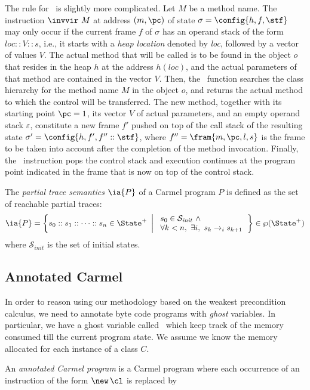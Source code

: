 The rule for \invvir\ is slightly more complicated. Let
$M$ be a method name. The instruction $\invvir\ M$ at
address $(m,\pc)$ of state $\sigma =\config{h,f,\stf}$ may only
occur if the current frame $f$  of $\sigma$ has an
operand stack of the form $\mathit{loc}::V::s$, i.e., it starts with a
{\em heap location} denoted by \textit{loc}, followed by a vector of
values $V$. The actual method that will be called is to be found in
the object $o$ that resides in the heap $h$ at the address $h(loc)$, and
the actual parameters of that method are contained in the vector
$V$. Then, the \methodLookup\ function searches the class hierarchy
for the method name $M$ in the object $o$, and returns the actual method
to which the control will be transferred.  The new method, together
with its starting point $\pc = 1$, its vector $V$ of actual parameters,
and an empty operand stack $\varepsilon$, constitute a new frame $f'$
pushed on top of the call stack of the resulting state 
$\sigma' = \config{h,f',f''::\stf}$, where $f'' = \fram{m,\pc,l,s}$ is the frame to be taken into account after the completion of the method invocation.
Finally, the \return\ instruction pops the control stack and
execution continues at the program point indicated in the frame that is
now on top of the control stack. 

The {\em partial trace semantics} $\ia{P}$ of a Carmel program $P$
is defined as the set of reachable partial traces:
$$\ia{P} = \left\lbrace s_0:: s_1::\cdots ::s_n \in\State^+\ \left|\ 
    \begin{array}[c]{l}
s_0\in\mathcal{S}_{\mathit{init}}\ \wedge\\
\forall k<n,\ \exists i,\ s_k\to_i s_{k+1}
\end{array}\right.
\right\rbrace\in\wp(\State^+)$$
where $\mathcal{S}_{\mathit{init}}$ is the set of initial states. 

\subsection{Annotated Carmel}
In order to reason using our methodology based on the weakest precondition calculus, we need to annotate byte code programs with {\em ghost} variables. In particular, we have a ghost variable called \Mem\ which keep track of the memory consumed till the current program state. We assume we know the memory allocated for each instance of a class $C$. 

An {\em annotated Carmel program} is a Carmel program where each occurrence of an instruction of the form $\new\, \cl$ is replaced by  

